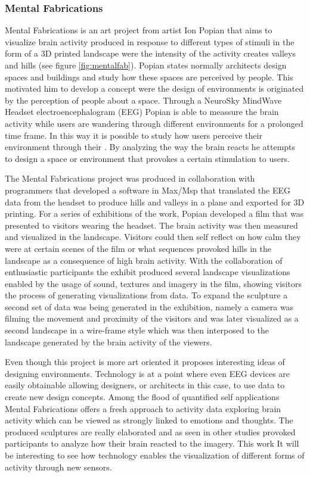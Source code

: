 \documentclass[../medieninformatik-arbeit.tex]{subfiles}
\begin{document}
\subsubsection{Mental Fabrications}
\label{sub:mentalfabrications}
Mental Fabrications is an art project from artist Ion Popian\cite{mental2014fabrications} that aims to visualize brain activity produced in response to different types of stimuli in the form of a 3D printed landscape were the intensity of the activity creates valleys and hills (see figure \ref{fig:mentalfab}). Popian states normally architects design spaces and buildings and study how these spaces are perceived by people. This motivated him to develop a concept were the design of environments is originated by the perception of people about a space. Through a NeuroSky MindWave Headset\cite{nuero2015sky} electroencephalogram (EEG) Popian is able to meassure the brain activity while users are wandering through different environments for a prolonged time frame. In this way it is possible to study how users perceive their environment through their . By analyzing the way the brain reacts he attempts to design a space or environment that provokes a certain stimulation to users.  

The Mental Fabrications project was produced in collaboration with programmers that developed a software in Max/Msp\cite{cylcing2015maxsmp} that translated the EEG data from the headset to produce hills and valleys in a plane and exported for 3D printing.
For a series of exhibitions of the work, Popian developed a film that was presented to visitors wearing the headset. The brain activity was then measured and visualized in the landscape. Visitors could then self reflect on how calm they were at certain scenes of the film or what sequences provoked hills in the landscape as a consequence of high brain activity. With the collaboration of enthusiastic participants the exhibit produced several landscape visualizations enabled by the usage of sound, textures and imagery in the film, showing visitors the process of generating visualizations from data. To expand the sculpture a second set of data was being generated in the exhibition, namely a camera was filming the movement and proximity of the visitors and was later visualized as a second landscape in a wire-frame style which was then interposed to the landscape generated by the brain activity of the viewers.

Even though this project is more art oriented it proposes interesting ideas of designing environments. Technology is at a point where even EEG devices are easily obtainable allowing designers, or architects in this case, to use data to create new design concepts. Among the flood of quantified self applications Mental Fabrications offers a fresh approach to activity data exploring brain activity which can be viewed as strongly linked to emotions and thoughts. The produced sculptures are really elaborated and as seen in other studies provoked participants to analyze how their brain reacted to the imagery. This work It will be interesting to see how technology enables the visualization of different forms of activity through new sensors. 
\end{document}
